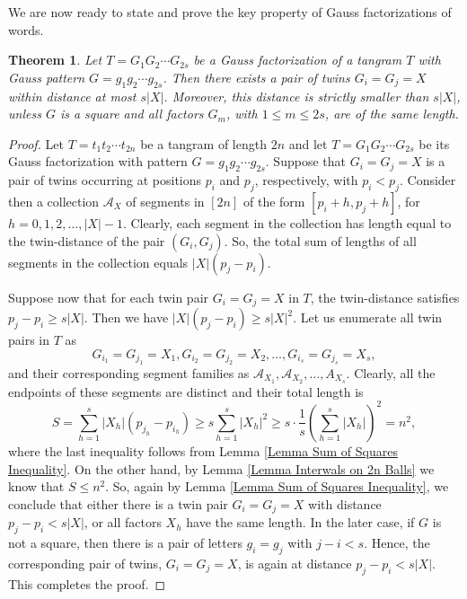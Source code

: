 \documentclass[12pt]{amsart}
\newtheorem{theorem}{Theorem}
\theoremstyle{plain}
\numberwithin{equation}{section}
\begin{document}
We are now ready to state and prove the key property of Gauss factorizations of words.

\begin{theorem}\label{Theorem Twin-Distance Discrete}
	Let $T=G_1G_2\cdots G_{2s}$ be a Gauss factorization of a tangram $T$ with Gauss pattern $G=g_1g_2\cdots g_{2s}$. Then there exists a pair of twins $G_i=G_j=X$ within distance at most $s|X|$. Moreover, this distance is strictly smaller than $s|X|$, unless $G$ is a square and all factors $G_m$, with $1\leqslant m\leqslant 2s$, are of the same length.
\end{theorem}

\begin{proof} Let $T=t_1t_2\cdots t_{2n}$ be a tangram of length $2n$ and let $T=G_1G_2\cdots G_{2s}$ be its Gauss factorization with pattern $G=g_1g_2\cdots g_{2s}$. Suppose that $G_i=G_j=X$ is a pair of twins occurring at positions $p_i$ and $p_j$, respectively, with $p_i<p_j$. Consider then a collection $\mathcal{A}_X$ of segments in $[2n]$ of the form $[p_i+h,p_j+h]$, for $h=0,1,2,\ldots, |X|-1$. Clearly, each segment in the collection has length equal to the twin-distance of the pair $(G_i,G_j)$. So, the total sum of lengths of all segments in the collection equals $|X|(p_j-p_i)$.
	
	Suppose now that for each twin pair $G_i=G_j=X$ in $T$, the twin-distance satisfies  $p_j-p_i\geqslant s|X|$. Then we have $|X|(p_j-p_i)\geqslant s|X|^2$. Let us enumerate all twin pairs in $T$ as $$G_{i_1}=G_{j_1}=X_1,G_{i_2}=G_{j_2}=X_2,\ldots, G_{i_s}=G_{j_s}=X_s,$$and their corresponding segment families as $\mathcal{A}_{X_1},\mathcal{A}_{X_2},\ldots,A_{X_s}$. Clearly, all the endpoints of these segments are distinct and their total length is $$S=\sum_{h=1}^{s}|X_h|(p_{j_h}-p_{i_h})\geqslant s\sum_{h=1}^{s}|X_h|^2\geqslant s\cdot \frac{1}{s}\left(\sum_{h=1}^{s}|X_h|\right)^2=n^2,$$
	where the last inequality follows from Lemma \ref{Lemma Sum of Squares Inequality}. On the other hand, by Lemma \ref{Lemma Interwals on 2n Balls} we know that $S\leqslant n^2$. So, again by Lemma \ref{Lemma Sum of Squares Inequality}, we conclude that either there is a twin pair $G_i=G_j=X$ with distance $p_j-p_i<s|X|$, or all factors $X_h$ have the same length. In the later case, if $G$ is not a square, then there is a pair of letters $g_i=g_j$ with $j-i<s$. Hence, the corresponding pair of twins, $G_i=G_j=X$, is again at distance $p_j-p_i<s|X|$. This completes the proof.
\end{proof}
\end{document}
